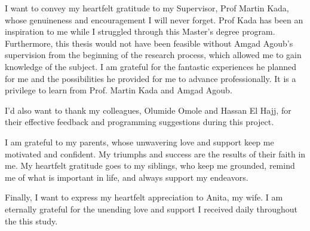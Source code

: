 
I want to convey my heartfelt gratitude to my Supervisor, Prof Martin Kada, whose genuineness and encouragement I will never forget. Prof Kada has been an inspiration to me while I struggled through this Master's degree program. Furthermore, this thesis would not have been feasible without Amgad Agoub's supervision from the beginning of the research process, which allowed me to gain knowledge of the subject. I am grateful for the fantastic experiences he planned for me and the possibilities he provided for me to advance professionally. It is a privilege to learn from Prof. Martin Kada and Amgad Agoub.


I'd also want to thank my colleagues, Olumide Omole and Hassan El Hajj, for their effective feedback and programming suggestions during this project.


I am grateful to my parents, whose unwavering love and support keep me motivated and confident. My triumphs and success are the results of their faith in me. My heartfelt gratitude goes to my siblings, who keep me grounded, remind me of what is important in life, and always support my endeavors.


Finally, I want to express my heartfelt appreciation to Anita, my wife. I am eternally grateful for the unending love and support I received daily throughout the this study.